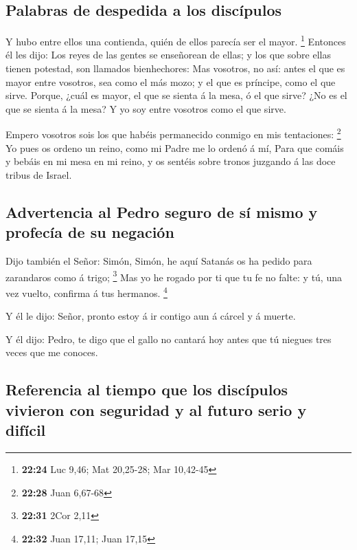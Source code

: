 \hypertarget{palabras-de-despedida-a-los-discuxedpulos}{%
\subsection{Palabras de despedida a los
discípulos}\label{palabras-de-despedida-a-los-discuxedpulos}}

 Y hubo entre ellos una contienda, quién de ellos parecía
ser el mayor. \footnote{\textbf{22:24} Luc 9,46; Mat 20,25-28; Mar
  10,42-45}  Entonces él les dijo: Los reyes de las gentes
se enseñorean de ellas; y los que sobre ellas tienen potestad, son
llamados bienhechores:  Mas vosotros, no así: antes el que
es mayor entre vosotros, sea como el más mozo; y el que es príncipe,
como el que sirve.  Porque, ¿cuál es mayor, el que se
sienta á la mesa, ó el que sirve? ¿No es el que se sienta á la mesa? Y
yo soy entre vosotros como el que sirve.

 Empero vosotros sois los que habéis permanecido conmigo en
mis tentaciones: \footnote{\textbf{22:28} Juan 6,67-68}  Yo
pues os ordeno un reino, como mi Padre me lo ordenó á mí, 
Para que comáis y bebáis en mi mesa en mi reino, y os sentéis sobre
tronos juzgando á las doce tribus de Israel.

\hypertarget{advertencia-al-pedro-seguro-de-suxed-mismo-y-profecuxeda-de-su-negaciuxf3n}{%
\subsection{Advertencia al Pedro seguro de sí mismo y profecía de su
negación}\label{advertencia-al-pedro-seguro-de-suxed-mismo-y-profecuxeda-de-su-negaciuxf3n}}

 Dijo también el Señor: Simón, Simón, he aquí Satanás os ha
pedido para zarandaros como á trigo; \footnote{\textbf{22:31} 2Cor 2,11}
 Mas yo he rogado por ti que tu fe no falte: y tú, una vez
vuelto, confirma á tus hermanos. \footnote{\textbf{22:32} Juan 17,11;
  Juan 17,15}

 Y él le dijo: Señor, pronto estoy á ir contigo aun á
cárcel y á muerte.

 Y él dijo: Pedro, te digo que el gallo no cantará hoy
antes que tú niegues tres veces que me conoces.

\hypertarget{referencia-al-tiempo-que-los-discuxedpulos-vivieron-con-seguridad-y-al-futuro-serio-y-difuxedcil}{%
\subsection{Referencia al tiempo que los discípulos vivieron con
seguridad y al futuro serio y
difícil}\label{referencia-al-tiempo-que-los-discuxedpulos-vivieron-con-seguridad-y-al-futuro-serio-y-difuxedcil}}

